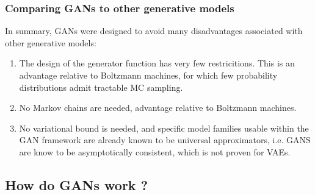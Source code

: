 \subsubsection{Comparing GANs to other generative models}
In summary, GANs were designed to avoid many disadvantages associated with other generative models:
\begin{enumerate}
	\item The design of the generator function has very few restricitions. This is an advantage relative to Boltzmann machines, for which few probability distributions admit tractable MC sampling.
	\item No Markov chains are needed, advantage relative to Boltzmann machines.
	\item No variational bound is needed, and specific model families usable within the GAN framework are already known to be universal approximators, i.e. GANS are know to be asymptotically consistent, which is not proven for VAEs.
\end{enumerate}


\subsection{How do GANs work ?}
